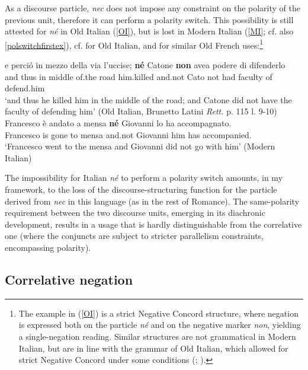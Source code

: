 \documentclass[output=paper,modfonts,nonflat,citecolor=brown,
showindex
]{langsci/langscibook}
\begin{document}
\noindent As a discourse particle, {\emph{nec}} does not impose any constraint on the polarity of the previous unit, therefore it can perform a polarity switch. This possibility is still attested for {\emph{n\'e}} in Old Italian (\ref{OI}), but is lost in Modern Italian (\ref{MI}; cf. also \ref{polswitchfirstex}), cf. \citet{Zanuttini10} for Old Italian, and \citet[]{Doetjes05} for similar Old French uses:{\footnote{The example in (\ref{OI}) is a strict Negative Concord structure, where negation is expressed both on the particle {\emph{n\'e}} and on the negative marker {\emph{non}}, yielding a single-negation reading. Similar structures are not grammatical in Modern Italian, but are in line with the grammar of Old Italian, which allowed for strict Negative Concord under some conditions (\citealt[]{Garzonio18}; \citealt[chapter 5]{Gianollo18}).}} 

{\begin{exe}
\ex
\begin{xlist}
\ex \label{OI} \gll e perci\'o in mezzo della via l'uccise; {\textbf{n\'e}} Catone {\textbf{non}} avea podere di difenderlo\\
and thus in middle of.the road him.killed and.not Cato not had faculty of defend.him\\

`and thus he killed him in the middle of the road; and Catone did not have the faculty of defending him' (Old Italian, Brunetto Latini {\emph{Rett.}} p. 115 l. 9-10) 
\ex \label{MI} \gll *Francesco \`e andato a mensa {\textbf{n\'e}} Giovanni lo ha accompagnato.\\
Francesco is gone to mensa and.not Giovanni him has accompanied.\\

`Francesco went to the mensa and Giovanni did not go with him' (Modern Italian)
\end{xlist}
\end{exe}}

\noindent The impossibility for Italian {\emph{n\'e}} to perform a polarity switch amounts, in my framework, to the loss of the discourse-structuring function for the particle derived from {\emph{nec}} in this language (as in the rest of Romance). The same-polarity requirement between the two discourse units, emerging in its diachronic development, results in a usage that is hardly distinguishable from the correlative one (where the conjuncts are subject to stricter parallelism constraints, encompassing polarity).  

\subsection{Correlative negation} \label{functioncorrelativeneg}
\end{document}
